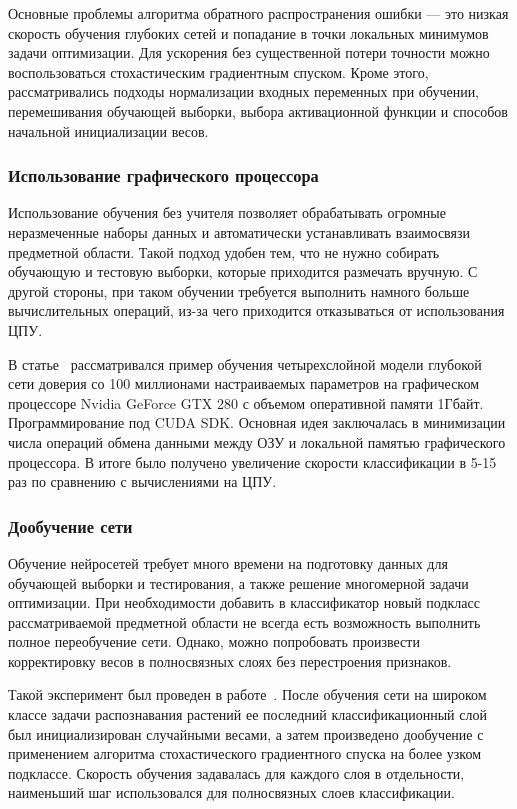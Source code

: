 \documentclass[a4paper,14pt]{extarticle} %
\begin{document}
Основные проблемы алгоритма обратного распространения ошибки --- это низкая скорость обучения глубоких сетей и попадание в точки локальных минимумов задачи оптимизации. Для ускорения без существенной потери точности можно воспользоваться стохастическим градиентным спуском. Кроме этого, рассматривались подходы нормализации входных переменных при обучении, перемешивания обучающей выборки, выбора активационной функции и способов начальной инициализации весов.

\subsubsection{Использование графического процессора}
\hspace{\parindent} Использование обучения без учителя позволяет обрабатывать огромные неразмеченные наборы данных и автоматически устанавливать взаимосвязи предметной области. Такой подход удобен тем, что не нужно собирать обучающую и тестовую выборки, которые приходится размечать вручную. С другой стороны, при таком обучении требуется выполнить намного больше вычислительных операций, из-за чего приходится отказываться от использования ЦПУ. 

В статье~\cite{raina2009large} рассматривался пример обучения четырехслойной модели глубокой сети доверия со 100 миллионами настраиваемых параметров на графическом процессоре Nvidia GeForce GTX 280 с объемом оперативной памяти 1Гбайт. Программирование под CUDA SDK. Основная идея заключалась в минимизации числа операций обмена данными между ОЗУ и локальной памятью графического процессора. В итоге было получено увеличение скорости классификации в 5-15 раз по сравнению с вычислениями на ЦПУ.

\subsubsection{Дообучение сети}
\hspace{\parindent} Обучение нейросетей требует много времени на подготовку данных для обучающей выборки и тестирования, а также решение многомерной задачи оптимизации. При необходимости добавить в классификатор новый подкласс рассматриваемой предметной области не всегда есть возможность выполнить полное переобучение сети. Однако, можно попробовать произвести корректировку весов в полносвязных слоях без перестроения признаков.

Такой эксперимент был проведен в работе~\cite{reyes2015fine}. После обучения сети на широком классе задачи распознавания растений ее последний классификационный слой был инициализирован случайными весами, а затем произведено дообучение с применением алгоритма стохастического градиентного спуска на более узком подклассе. Скорость обучения задавалась для каждого слоя в отдельности, наименьший шаг использовался для полносвязных слоев классификации. 
\end{document}
